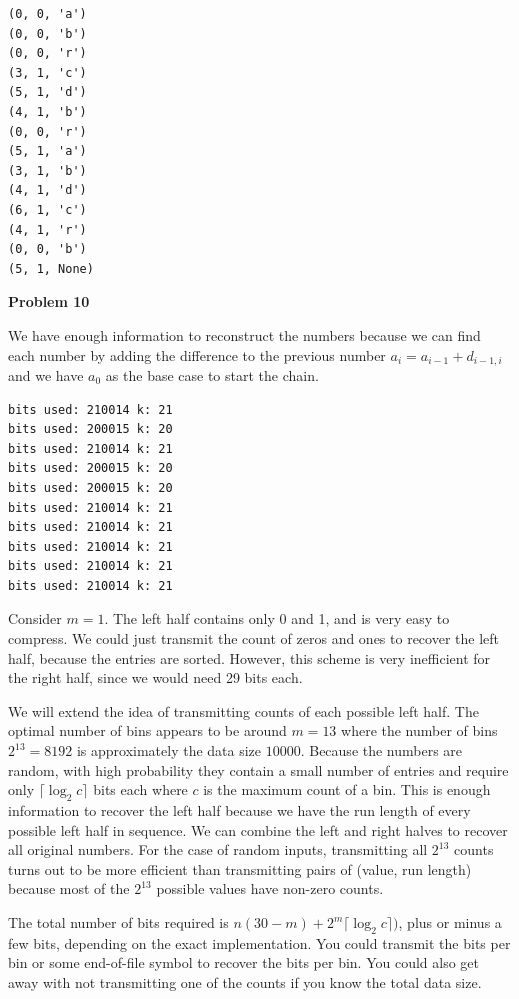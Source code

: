 \documentclass[11pt]{article}
\begin{document}
\begin{verbatim}
(0, 0, 'a')
(0, 0, 'b')
(0, 0, 'r')
(3, 1, 'c')
(5, 1, 'd')
(4, 1, 'b')
(0, 0, 'r')
(5, 1, 'a')
(3, 1, 'b')
(4, 1, 'd')
(6, 1, 'c')
(4, 1, 'r')
(0, 0, 'b')
(5, 1, None)
\end{verbatim}

\pagebreak

\noindent \textbf{Problem 10}

We have enough information to reconstruct the numbers because we can find each number by adding the difference to the previous number $a_i = a_{i-1} + d_{i-1,i}$ and we have $a_0$ as the base case to start the chain.

\begin{verbatim}
bits used: 210014 k: 21
bits used: 200015 k: 20
bits used: 210014 k: 21
bits used: 200015 k: 20
bits used: 200015 k: 20
bits used: 210014 k: 21
bits used: 210014 k: 21
bits used: 210014 k: 21
bits used: 210014 k: 21
bits used: 210014 k: 21
\end{verbatim}

Consider $m=1$.  The left half contains only 0 and 1, and is very easy to compress.  We could just transmit the count of zeros and ones to recover the left half, because the entries are sorted.  However, this scheme is very inefficient for the right half, since we would need 29 bits each.

We will extend the idea of transmitting counts of each possible left half.  The optimal number of bins appears to be around $m=13$ where the number of bins $2^{13}=8192$ is approximately the data size $10000$.  Because the numbers are random, with high probability they contain a small number of entries and require only $\lceil\log_2 c\rceil$ bits each where $c$ is the maximum count of a bin.  This is enough information to recover the left half because we have the run length of every possible left half in sequence.  We can combine the left and right halves to recover all original numbers.  For the case of random inputs, transmitting all $2^{13}$ counts turns out to be more efficient than transmitting pairs of (value, run length) because most of the $2^{13}$ possible values have non-zero counts.

The total number of bits required is $n(30 - m) + 2^m\lceil\log_2 c\rceil)$, plus or minus a few bits, depending on the exact implementation.  You could transmit the bits per bin or some end-of-file symbol to recover the bits per bin.  You could also get away with not transmitting one of the counts if you know the total data size.
\end{document}
